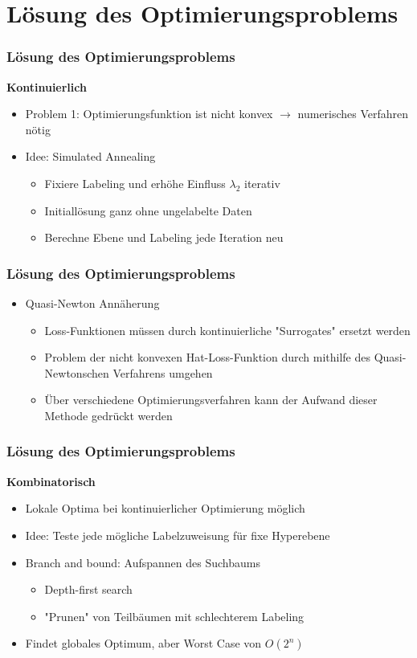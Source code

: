 \documentclass{beamer}
\begin{document}
\section{L\"osung des Optimierungsproblems}

\begin{frame}
	\frametitle{L\"osung des Optimierungsproblems}
	\textbf{Kontinuierlich}
	\begin{itemize}
		\item Problem 1: Optimierungsfunktion ist nicht konvex $\rightarrow$ numerisches Verfahren n\"otig
		\item Idee: Simulated Annealing
		\begin{itemize}
			\item Fixiere Labeling und erh\"ohe Einfluss $\lambda_2$ iterativ
			\item Initiall\"osung ganz ohne ungelabelte Daten
			\item Berechne Ebene und Labeling jede Iteration neu
		\end{itemize}
	\end{itemize}
\end{frame}

\begin{frame}
    \frametitle{L\"osung des Optimierungsproblems}
    \begin{itemize}
        \item Quasi-Newton Ann\"aherung
        \begin{itemize}
            \item Loss-Funktionen m\"ussen durch kontinuierliche "Surrogates" ersetzt werden
            \item Problem der nicht konvexen Hat-Loss-Funktion durch mithilfe des Quasi-Newtonschen Verfahrens umgehen
            \item \"Uber verschiedene Optimierungsverfahren kann der Aufwand dieser Methode gedr\"uckt werden
        \end{itemize}
    \end{itemize}
\end{frame}

\begin{frame}
    \frametitle{L\"osung des Optimierungsproblems}
    \textbf{Kombinatorisch}
    \begin{itemize}
    	\item Lokale Optima bei kontinuierlicher Optimierung m\"oglich
        \item Idee: Teste jede m\"ogliche Labelzuweisung f\"ur fixe Hyperebene
        \item Branch and bound: Aufspannen des Suchbaums
        \begin{itemize}
        	\item Depth-first search
        	\item "Prunen" von Teilb\"aumen mit schlechterem Labeling
        \end{itemize}
        \item Findet globales Optimum, aber Worst Case von $O(2^n)$
    \end{itemize}
\end{frame}
\end{document}

